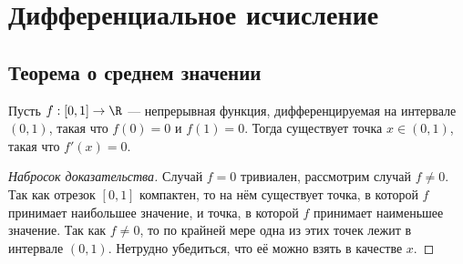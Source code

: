 \documentclass[
	extrafontsizes,
	11pt,
	hyphens,
]{memoir}
\begin{document}
\chapter{Дифференциальное исчисление}


\section{Теорема о среднем значении}

\begin{theorem}
Пусть \(f : [0,1] \to \R\) --- непрерывная функция, дифференцируемая на интервале \((0,1)\), такая что \(f(0) = 0\) и \(f(1) = 0\).%
\label{thm:RolleMean}
Тогда существует точка \(x \in (0,1)\), такая что \(f'(x) = 0\).
\end{theorem}



\begin{proof}[Набросок доказательства]
Случай \(f = 0\) тривиален, рассмотрим случай \(f \neq 0\).
Так как отрезок \([0,1]\) компактен, то на нём существует точка, в которой \(f\) принимает наибольшее значение, и точка, в которой \(f\) принимает наименьшее значение.
Так как \(f \neq 0\), то по крайней мере одна из этих точек лежит в интервале \((0,1)\).
Нетрудно убедиться, что её можно взять в качестве \(x\).
\end{proof}
\end{document}
